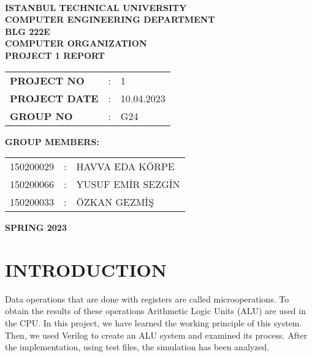 \documentclass[pdftex,12pt,a4paper]{article}
\begin{document}
\begin{titlepage}
\begin{center}
\textbf{}\\
\textbf{\Large{ISTANBUL TECHNICAL UNIVERSITY}}\\
\vspace{0.5cm}
\textbf{\Large{COMPUTER ENGINEERING DEPARTMENT}}\\
\vspace{2cm}
\textbf{\Large{BLG 222E\\ COMPUTER ORGANIZATION\\ PROJECT 1 REPORT}}\\
\vspace{2.8cm}
\begin{table}[ht]
\centering
\Large{
\begin{tabular}{lcl}
\textbf{PROJECT NO}  & : & 1 \\
\textbf{PROJECT DATE}  & : & 10.04.2023 \\
\textbf{GROUP NO}  & : & G24 \\
\end{tabular}}
\end{table}
\vspace{1cm}
\textbf{\Large{GROUP MEMBERS:}}\\
\begin{table}[ht]
\centering
\Large{
\begin{tabular}{rcl}
150200029  & : & HAVVA EDA KÖRPE \\
150200066  & : & YUSUF EMİR SEZGİN \\
150200033  & : & ÖZKAN GEZMİŞ \\
\end{tabular}}
\end{table}
\vspace{2.8cm}
\textbf{\Large{SPRING 2023}}

\end{center}

\end{titlepage}

\thispagestyle{empty}

\setcounter{tocdepth}{4}
\tableofcontents
\clearpage

\setcounter{page}{1}

\section{INTRODUCTION}
Data operations that are done with registers are called microoperations. To obtain the results of these operations Arithmetic Logic Units (ALU) are used in the CPU. In this project, we have learned the working principle of this system. Then, we used Verilog to create an ALU system and examined its process. After the implementation, using test files, the simulation has been analyzed.
\end{document}
